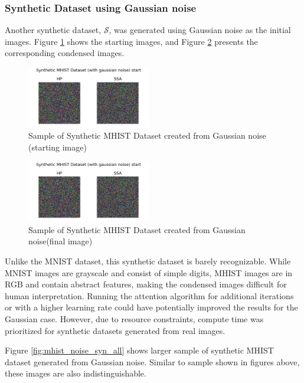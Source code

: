 \documentclass[conference, compsoc]{IEEEtran}
\begin{document}
	\subsubsection{Synthetic Dataset using Gaussian noise} \hfill
	
	Another synthetic dataset, $\mathcal{S}$, was generated using Gaussian noise as the initial images. Figure \ref{fig:mhist_noise_sample} shows the starting images, and Figure \ref{fig:mhist_noise_final} presents the corresponding condensed images. 
	
	\begin{figure}[H]
		\centering
		\includegraphics[width=0.48\textwidth]{mhist_noise_sample.png}
		\caption{Sample of Synthetic MHIST Dataset created from Gaussian noise (starting image)}
		\label{fig:mhist_noise_sample}
	\end{figure}
	\begin{figure}[H]
		\centering
		\includegraphics[width=0.48\textwidth]{mhist_noise_sample.png}
		\caption{Sample of Synthetic MHIST Dataset created from Gaussian noise(final image)}
		\label{fig:mhist_noise_final}
	\end{figure}
	
	Unlike the MNIST dataset, this synthetic dataset is barely recognizable. While MNIST images are grayscale and consist of simple digits, MHIST images are in RGB and contain abstract features, making the condensed images difficult for human interpretation. Running the attention algorithm for additional iterations or with a higher learning rate could have potentially improved the results for the Gaussian case. However, due to resource constraints, compute time was prioritized for synthetic datasets generated from real images.
	
	Figure \ref{fig:mhist_noise_syn_all} shows larger sample of synthetic MHIST dataset generated from Gaussian noise. Similar to sample shown in figures above, these images are also indistinguishable. 
	
\end{document}
